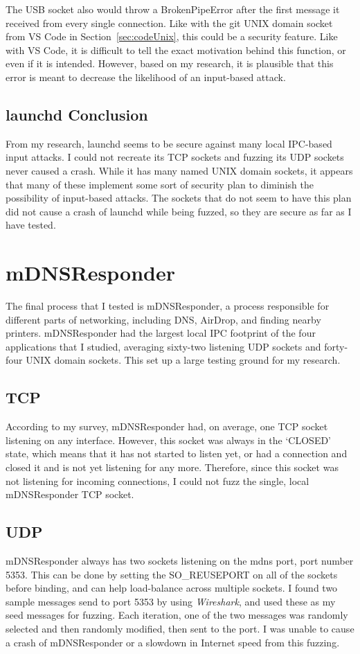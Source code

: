 The USB socket also would throw a BrokenPipeError after the first message it received from every single connection.  Like with the git UNIX domain socket from VS Code in Section~\ref{sec:codeUnix}, this could be a security feature.  Like with VS Code, it is difficult to tell the exact motivation behind this function, or even if it is intended.  However, based on my research, it is plausible that this error is meant to decrease the likelihood of an input-based attack.

\subsection{launchd Conclusion}
\label{sec:launchdConclusion}
From my research, launchd seems to be secure against many local IPC-based input attacks.  I could not recreate its TCP sockets and fuzzing its UDP sockets never caused a crash.  While it has many named UNIX domain sockets, it appears that many of these implement some sort of security plan to diminish the possibility of input-based attacks.  The sockets that do not seem to have this plan did not cause a crash of launchd while being fuzzed, so they are secure as far as I have tested.

\section{mDNSResponder}
\label{sec:mdns}
The final process that I tested is mDNSResponder, a process responsible for different parts of networking, including DNS, AirDrop, and finding nearby printers.  mDNSResponder had the largest local IPC footprint of the four applications that I studied, averaging sixty-two listening UDP sockets and forty-four UNIX domain sockets.  This set up a large testing ground for my research.

\subsection{TCP}
\label{sec:mdnsTcp}
According to my survey, mDNSResponder had, on average, one TCP socket listening on any interface.  However, this socket was always in the `CLOSED' state, which means that it has not started to listen yet, or had a connection and closed it and is not yet listening for any more.  Therefore, since this socket was not listening for incoming connections, I could not fuzz the single, local mDNSResponder TCP socket.

\subsection{UDP}
\label{sec:mdnsUdp}
mDNSResponder always has two sockets listening on the mdns port, port number 5353.  This can be done by setting the SO\_REUSEPORT on all of the sockets before binding, and can help load-balance across multiple sockets.  I found two sample messages send to port 5353 by using \textit{Wireshark}, and used these as my seed messages for fuzzing.  Each iteration, one of the two messages was randomly selected and then randomly modified, then sent to the port.  I was unable to cause a crash of mDNSResponder or a slowdown in Internet speed from this fuzzing.


